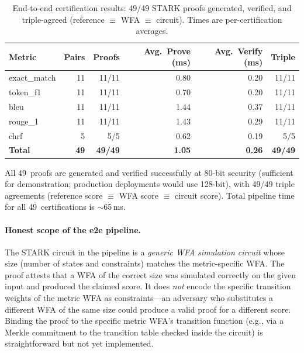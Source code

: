 \documentclass[11pt]{article}
\begin{document}
\begin{table}[t]
\centering
\caption{End-to-end certification results: 49/49 STARK proofs generated,
  verified, and triple-agreed (reference $\equiv$ WFA $\equiv$ circuit).
  Times are per-certification averages.}
\label{tab:e2e}
\smallskip
\begin{tabular}{@{}lrrrrr@{}}
\toprule
\textbf{Metric} & \textbf{Pairs} & \textbf{Proofs} &
  \textbf{Avg.\ Prove (ms)} & \textbf{Avg.\ Verify (ms)} & \textbf{Triple} \\
\midrule
exact\_match & 11 & 11/11 & 0.80 & 0.20 & 11/11 \\
token\_f1    & 11 & 11/11 & 0.70 & 0.20 & 11/11 \\
bleu         & 11 & 11/11 & 1.44 & 0.37 & 11/11 \\
rouge\_1     & 11 & 11/11 & 1.43 & 0.29 & 11/11 \\
chrf         & 5  &  5/5  & 0.62 & 0.19 &  5/5 \\
\midrule
\textbf{Total} & \textbf{49} & \textbf{49/49} & \textbf{1.05} &
  \textbf{0.26} & \textbf{49/49} \\
\bottomrule
\end{tabular}
\end{table}

All 49~proofs are generated and verified successfully at 80-bit
security (sufficient for demonstration; production deployments would use
128-bit), with 49/49 triple agreements (reference score $\equiv$ WFA
score $\equiv$ circuit score).  Total pipeline time for all
49~certifications is ${\sim}$65\,ms.

\paragraph{Honest scope of the e2e pipeline.}
The STARK circuit in the pipeline is a \emph{generic WFA simulation
circuit} whose size (number of states and constraints) matches the
metric-specific WFA.  The proof attests that a WFA of the correct size
was simulated correctly on the given input and produced the claimed
score.  It does \emph{not} encode the specific transition weights of the
metric WFA as constraints---an adversary who substitutes a different WFA
of the same size could produce a valid proof for a different score.
Binding the proof to the specific metric WFA's transition function
(e.g., via a Merkle commitment to the transition table checked inside
the circuit) is straightforward but not yet implemented.


\end{document}
